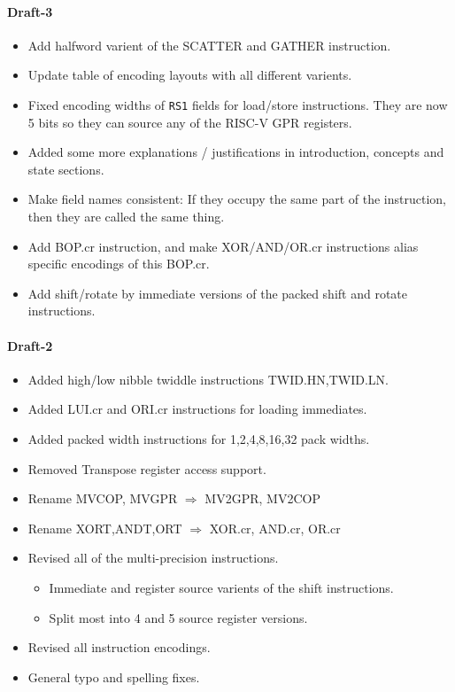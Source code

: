 
\paragraph{Draft-3}
\begin{itemize}
\item Add halfword varient of the SCATTER and GATHER instruction.
\item Update table of encoding layouts with all different varients.
\item Fixed encoding widths of {\tt RS1} fields for load/store
    instructions. They are now 5 bits so they can source any of the
    RISC-V GPR registers.
\item Added some more explanations / justifications in introduction,
    concepts and state sections.
\item Make field names consistent: If they occupy the same part of
    the instruction, then they are called the same thing.
\item Add BOP.cr instruction, and make XOR/AND/OR.cr instructions
    alias specific encodings of this BOP.cr.
\item Add shift/rotate by immediate versions of the packed
    shift and rotate instructions.
\end{itemize}


\paragraph{Draft-2}
\begin{itemize}
\item Added high/low nibble twiddle instructions TWID.HN,TWID.LN.
\item Added LUI.cr and ORI.cr instructions for loading immediates.
\item Added packed width instructions for 1,2,4,8,16,32 pack widths.
\item Removed Transpose register access support.
\item Rename MVCOP, MVGPR  $\Rightarrow$ MV2GPR, MV2COP
\item Rename XORT,ANDT,ORT $\Rightarrow$ XOR.cr, AND.cr, OR.cr
\item Revised all of the multi-precision instructions.
\begin{itemize}
    \item Immediate and register source varients of the shift instructions.
    \item Split most into 4 and 5 source register versions.
\end{itemize}
\item Revised all instruction encodings.
\item General typo and spelling fixes.
\end{itemize}

